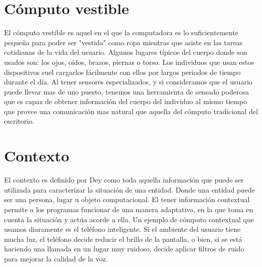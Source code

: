 \documentclass[letterpaper,12pt]{cicese}
\begin{document}
			\section{C\'omputo vestible}
				El c\'omputo vestible es aquel en el que la computadora es lo suficientemente peque\~na para poder ser "vestida" como ropa mientras que asiste en las
				tareas cotidianas de la vida del usuario\citep{Starner97augmentedreality}. Algunos lugares t\'ipicos del cuerpo donde son usados son: los ojos, o\'idos, brazos, piernas o torso.
				Los individuos que usan estos dispositivos suel cargarlos f\'acilmente con ellos por largos periodos de tiempo durante el d\'ia. Al tener sensores
				especializados, y si consideramos que el usuario puede llevar mas de uno puesto, tenemos una herramienta de sensado poderosa que es capaz de obtener
				informaci\'on del cuerpo del individuo al mismo tiempo que provee una comunicaci\'on mas natural que aquella del c\'omputo tradicional del escritorio.

			\section{Contexto}
				El contexto es definido por Dey \citep{Dey2001} como toda aquella informaci\'on que puede ser utilizada para caracterizar la situaci\'on de una entidad. Donde una
				entidad puede ser una persona, lugar u objeto computacional. El tener informaci\'on contextual permite a los programas funcionar de una manera adaptativa,
				en la que toma en cuenta la situaci\'on y act\'ua acorde a ella. Un ejemplo de c\'omputo contextual que usamos diaramente es el tel\'efono inteligente.
				Si el ambiente del usuario tiene mucha luz, el tel\'efono decide reducir el brillo de la pantalla, o bien, si se est\'a haciendo una llamada en un lugar muy ruidoso,
				decide aplicar filtros de ruido para mejorar la calidad de la voz.
		
\end{document}
